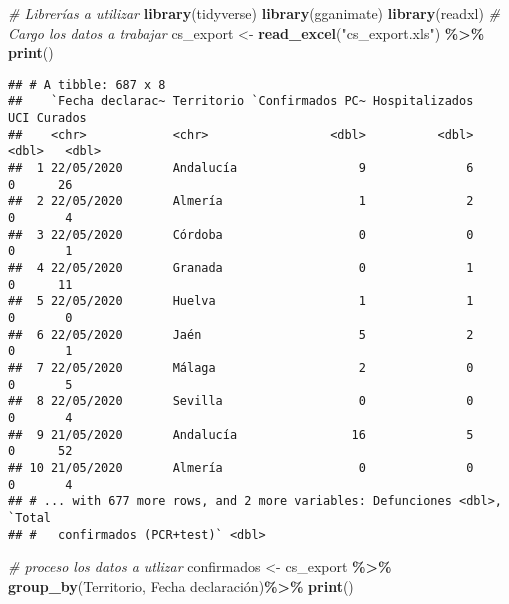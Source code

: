 \documentclass[
]{book}
\newenvironment{Shaded}{\begin{snugshade}}{\end{snugshade}}
\newcommand{\CommentTok}[1]{\textcolor[rgb]{0.56,0.35,0.01}{\textit{#1}}}
\newcommand{\DataTypeTok}[1]{\textcolor[rgb]{0.13,0.29,0.53}{#1}}
\newcommand{\KeywordTok}[1]{\textcolor[rgb]{0.13,0.29,0.53}{\textbf{#1}}}
\newcommand{\NormalTok}[1]{#1}
\newcommand{\OperatorTok}[1]{\textcolor[rgb]{0.81,0.36,0.00}{\textbf{#1}}}
\newcommand{\StringTok}[1]{\textcolor[rgb]{0.31,0.60,0.02}{#1}}
\begin{document}
\begin{Shaded}
\begin{Highlighting}[]
\CommentTok{\# Librerías a utilizar}
\KeywordTok{library}\NormalTok{(tidyverse)}
\KeywordTok{library}\NormalTok{(gganimate)}
\KeywordTok{library}\NormalTok{(readxl)}
\CommentTok{\# Cargo los datos a trabajar}
\NormalTok{cs\_export \textless{}{-}}\StringTok{ }\KeywordTok{read\_excel}\NormalTok{(}\StringTok{"cs\_export.xls"}\NormalTok{) }\OperatorTok{\%\textgreater{}\%}\StringTok{ }\KeywordTok{print}\NormalTok{()}
\end{Highlighting}
\end{Shaded}

\begin{verbatim}
## # A tibble: 687 x 8
##    `Fecha declarac~ Territorio `Confirmados PC~ Hospitalizados   UCI Curados
##    <chr>            <chr>                 <dbl>          <dbl> <dbl>   <dbl>
##  1 22/05/2020       Andalucía                 9              6     0      26
##  2 22/05/2020       Almería                   1              2     0       4
##  3 22/05/2020       Córdoba                   0              0     0       1
##  4 22/05/2020       Granada                   0              1     0      11
##  5 22/05/2020       Huelva                    1              1     0       0
##  6 22/05/2020       Jaén                      5              2     0       1
##  7 22/05/2020       Málaga                    2              0     0       5
##  8 22/05/2020       Sevilla                   0              0     0       4
##  9 21/05/2020       Andalucía                16              5     0      52
## 10 21/05/2020       Almería                   0              0     0       4
## # ... with 677 more rows, and 2 more variables: Defunciones <dbl>, `Total
## #   confirmados (PCR+test)` <dbl>
\end{verbatim}

\begin{Shaded}
\begin{Highlighting}[]
\CommentTok{\# proceso los datos a utlizar}
\NormalTok{confirmados \textless{}{-}}\StringTok{ }
\StringTok{ }\NormalTok{cs\_export }\OperatorTok{\%\textgreater{}\%}\StringTok{ }
\StringTok{  }\KeywordTok{group\_by}\NormalTok{(Territorio, }\StringTok{\textasciigrave{}}\DataTypeTok{Fecha declaración}\StringTok{\textasciigrave{}}\NormalTok{)}\OperatorTok{\%\textgreater{}\%}\StringTok{ }
\StringTok{  }\KeywordTok{print}\NormalTok{()}
\end{Highlighting}
\end{Shaded}
\end{document}
